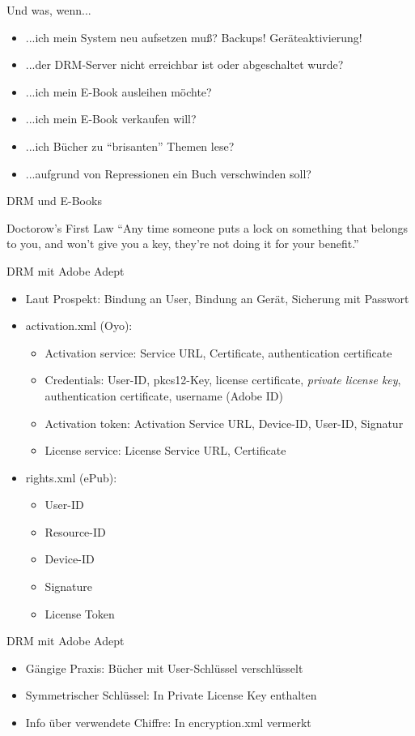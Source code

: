 \begin{frame}{Und was, wenn...}
	\begin{itemize}
		\item ...ich mein System neu aufsetzen muß? Backups! Geräteaktivierung!
		\item ...der DRM-Server nicht erreichbar ist oder abgeschaltet wurde?
		\item ...ich mein E-Book ausleihen möchte?
		\item ...ich mein E-Book verkaufen will?
		\item ...ich Bücher zu "`brisanten"' Themen lese?
		\item ...aufgrund von Repressionen ein Buch verschwinden soll?
	\end{itemize}
\end{frame}

\begin{frame}{DRM und E-Books}
	\begin{block}{Doctorow's First Law}
		"`Any time someone puts a lock on something that belongs to you, and won’t give you a key, they’re not doing it for your benefit."'
	\end{block}
\end{frame}

\begin{frame}{DRM mit Adobe Adept}
	\begin{itemize}
		\item Laut Prospekt: Bindung an User, Bindung an Gerät, Sicherung mit Passwort
		\item activation.xml (Oyo):
		\begin{itemize}
			\item Activation service: Service URL, Certificate, authentication certificate
			\item Credentials: User-ID, pkcs12-Key, license certificate, {\em private license key}, authentication certificate, username (Adobe ID)
			\item Activation token: Activation Service URL, Device-ID, User-ID, Signatur
			\item License service: License Service URL, Certificate
		\end{itemize}
		\item rights.xml (ePub):
		\begin{itemize}
			\item User-ID
			\item Resource-ID
			\item Device-ID
			\item Signature
			\item License Token
		\end{itemize}
	\end{itemize}
\end{frame}


\begin{frame}{DRM mit Adobe Adept}
	\begin{itemize}
		\item Gängige Praxis: Bücher mit User-Schlüssel verschlüsselt
		\item Symmetrischer Schlüssel: In Private License Key enthalten
		\item Info über verwendete Chiffre: In encryption.xml vermerkt
	\end{itemize}
\end{frame}

